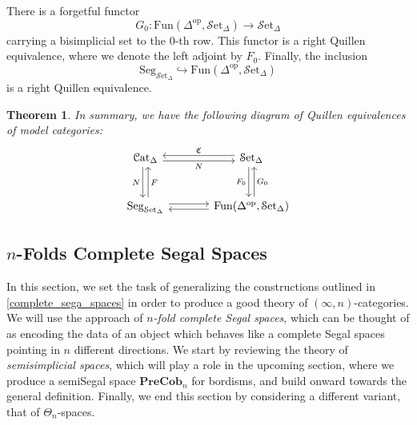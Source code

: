 \documentclass[a4paper,11pt]{article}
\newcommand{\ccal}{\mathcal{C}}
\newcommand{\scal}{\mathcal{S}}
\theoremstyle{plain}
\newtheorem{thm}{Theorem}[section]
\theoremstyle{definition}
\theoremstyle{remark}
\begin{document}
There is a forgetful functor 
$$G_0 \colon \text{Fun}(\Delta^{\text{op}}, \scal \text{et}_{\Delta}) \to \scal \text{et}_{\Delta}$$
carrying a bisimplicial set to the $0$-th row. This functor is a right Quillen equivalence, where we denote the left adjoint by $F_0$. Finally, the inclusion 
$$\text{Seg}_{\scal \text{et}_{\Delta}} \hookrightarrow \text{Fun}(\Delta^{\text{op}}, \scal \text{et}_{\Delta})$$
is a right Quillen equivalence.



\begin{thm}
In summary, we have the following diagram of Quillen equivalences of model categories: 
\begin{equation*}
\begin{tikzcd}[row sep = large, column sep = large]
\ccal \text{at}_{\Delta} \arrow[d,swap,  shift right, "N"]  \arrow[r,swap, shift right, "N"] & \scal \text{et}_{\Delta} \arrow[l, swap, shift right, "\mathfrak{C}"] \arrow[d, swap, shift right, "F_0"] \\
\text{Seg}_{\scal \text{et}_{\Delta}} \arrow[u,swap, shift right, "F"] \arrow[r, shift left] & \text{Fun}(\Delta^{\text{op}}, \scal \text{et}_{\Delta}) \arrow[l, shift left] \arrow[u, swap, shift right, "G_0"]
\end{tikzcd}
\end{equation*}
\end{thm}











 








\subsection{$n$-Folds Complete Segal Spaces}

In this section, we set the task of generalizing the constructions outlined in \ref{complete_sega_spaces} in order to produce a good theory of $(\infty, n)$-categories. We will use the approach of \textit{$n$-fold complete Segal spaces}, which can be thought of as encoding the data of an object which behaves like a complete Segal spaces pointing in $n$ different directions. We start by reviewing the theory of \textit{semisimplicial spaces}, which will play a role in the upcoming section, where we produce a semiSegal space $\textbf{PreCob}_n$ for bordisms, and build onward towards the general definition. Finally, we end this section by considering a different variant, that of $\Theta_n$-spaces.  
\end{document}
